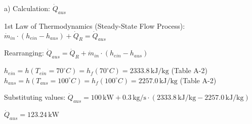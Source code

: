 a) Calculation: \( \dot{Q}_{aus} \)  

1st Law of Thermodynamics (Steady-State Flow Process):  
\( \dot{m}_{in} \cdot (h_{ein} - h_{aus}) + \dot{Q}_R = \dot{Q}_{aus} \)  

Rearranging:  
\( \dot{Q}_{aus} = \dot{Q}_R + \dot{m}_{in} \cdot (h_{ein} - h_{aus}) \)  

\( h_{ein} = h(T_{ein} = 70^\circ C) = h_f(70^\circ C) = 2333.8 \, \text{kJ/kg} \) (Table A-2)  
\( h_{aus} = h(T_{aus} = 100^\circ C) = h_f(100^\circ C) = 2257.0 \, \text{kJ/kg} \) (Table A-2)  

Substituting values:  
\( \dot{Q}_{aus} = 100 \, \text{kW} + 0.3 \, \text{kg/s} \cdot (2333.8 \, \text{kJ/kg} - 2257.0 \, \text{kJ/kg}) \)  

\( \dot{Q}_{aus} = 123.24 \, \text{kW} \)